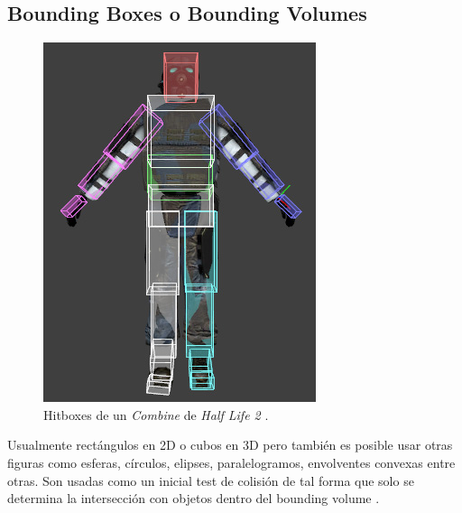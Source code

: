\subsection{Bounding Boxes o Bounding Volumes}
\setlength\intextsep{0pt}
\begin{figure}
\includegraphics[width=\linewidth]{semana5/Hitbox.jpg}
\caption{Hitboxes de un \emph{Combine} de \emph{Half Life 2} \cite{valve_hit} \cite{halflife2}.}
\label{fig:hitboxes}
\end{figure}
Usualmente rectángulos en 2D o cubos en 3D pero también es posible usar otras figuras como esferas, círculos, elipses, paralelogramos, envolventes convexas entre otras. Son usadas como un inicial test de colisión de tal forma que solo se determina la intersección con objetos dentro del bounding volume \cite{douglas_bbox}.
